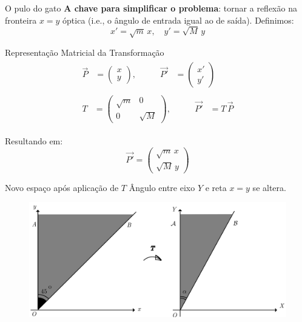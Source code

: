 \documentclass{beamer}
\begin{document}
\begin{frame}{O pulo do gato}
  \textbf{A chave para simplificar o problema}: tornar a reflexão na fronteira $x=y$ óptica (i.e., o ângulo de entrada igual ao de saída). Definimos:
  \begin{equation*}
    x' = \sqrt{m}\,x,\quad y' = \sqrt{M}\,y
  \end{equation*}
\end{frame}

\begin{frame}{Representação Matricial da Transformação}
  \begin{gather*}
    \begin{alignedat}{2}
      \vec{P} &= \begin{pmatrix} x \\ y \end{pmatrix}, &\qquad \vec{P'} &= \begin{pmatrix} x' \\ y' \end{pmatrix}
    \end{alignedat}
    \\[2ex] %
    \begin{alignedat}{2}
      T &= \begin{pmatrix} \sqrt{m} & 0 \\ 0 & \sqrt{M} \end{pmatrix}, &\qquad \vec{P'} &= T\,\vec{P}
    \end{alignedat}
  \end{gather*}

  Resultando em:
  \begin{equation*}
    \vec{P'}=\begin{pmatrix}\sqrt m\,x\\\sqrt M\,y\end{pmatrix}
  \end{equation*}
\end{frame}

\begin{frame}{Novo espaço após aplicação de $T$}
  Ângulo entre eixo $Y$ e reta $x=y$ se altera.
  \begin{figure}
    \centering
    \includegraphics[width=1\textwidth]{images/image-3.png}
  \end{figure}
\end{frame}
\end{document}
